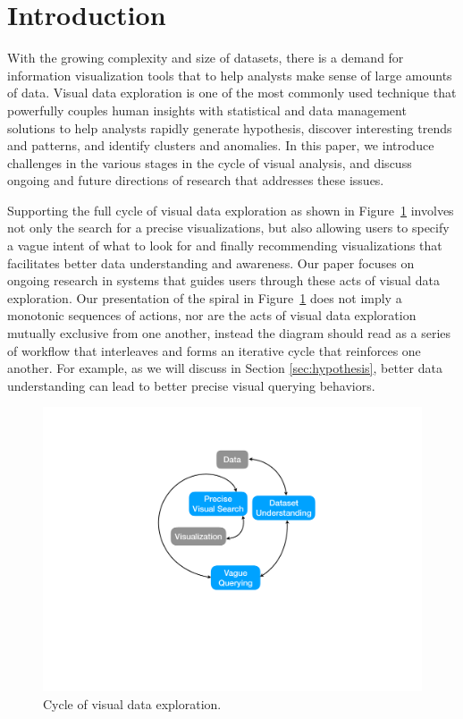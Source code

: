 \section{Introduction}%
\par With the growing complexity and size of datasets, there is a demand for information visualization tools that to help analysts make sense of large amounts of data. Visual data exploration is one of the most commonly used technique that powerfully couples human insights with statistical and data management solutions to help analysts rapidly generate hypothesis, discover interesting trends and patterns, and identify clusters and anomalies. In this paper, we introduce challenges in the various stages in the cycle of visual analysis, and discuss ongoing and future directions of research that addresses these issues.
\par Supporting the full cycle of visual data exploration as shown in Figure~\ref{fig:cycle} involves not only the search for a precise visualizations, but also allowing users to specify a vague intent of what to look for and finally recommending visualizations that facilitates better data understanding and awareness. Our paper focuses on ongoing research in systems that guides users through these acts of visual data exploration. Our presentation of the spiral in Figure~\ref{fig:cycle} does not imply a monotonic sequences of actions, nor are the acts of visual data exploration mutually exclusive from one another, instead the diagram should read as a series of workflow that interleaves and forms an iterative cycle that reinforces one another. For example, as we will discuss in Section \ref{sec:hypothesis}, better data understanding can lead to better precise visual querying behaviors.
\begin{figure}[h!]
\label{fig:cycle}
\centering
\includegraphics[width=0.4\linewidth]{figures/cycle.pdf}
\caption{Cycle of visual data exploration.}
\end{figure}
